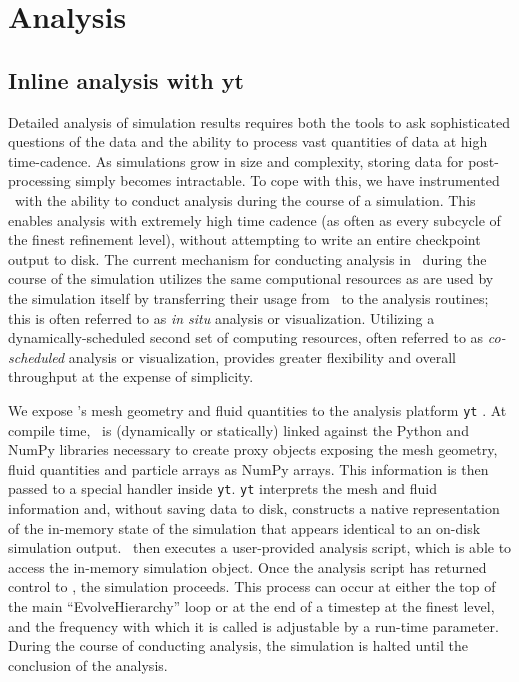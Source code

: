 
\section{Analysis}
\label{sec.num.analysis}

\subsection{Inline analysis with yt}

Detailed analysis of simulation results requires both the tools to ask
sophisticated questions of the data and the ability to process vast quantities of
data at high time-cadence.  As simulations grow in size and complexity, storing data
for post-processing simply becomes intractable.  To cope with this, we have
instrumented \enzo\ with the ability to conduct analysis during the course of a
simulation.  This enables analysis with extremely high time cadence (as often
as every subcycle of the finest refinement level), without
attempting to write an entire checkpoint output to disk.  The current mechanism
for conducting analysis in \enzo\ during the course of the simulation utilizes
the same computional resources as are used by the simulation itself by transferring their usage 
from \enzo\ to the analysis routines; this is often
referred to as \textit{in situ} analysis or visualization.  Utilizing a
dynamically-scheduled second set of computing resources, often referred to as
\textit{co-scheduled} analysis or visualization, provides greater flexibility and overall
throughput at the expense of simplicity.

We expose \enzo's mesh geometry and fluid quantities to the analysis platform
\texttt{yt} \citep{2011ApJS..192....9T, 2011arXiv1112.4482T}.  At compile time,
\enzo\ is (dynamically or statically) linked against the Python and NumPy
libraries necessary to create proxy objects exposing the mesh geometry,
fluid quantities and particle arrays as NumPy arrays.  This information is then
passed to a special handler inside \texttt{yt}.  \texttt{yt} interprets the
mesh and fluid information and, without saving data to disk, constructs a native representation of the in-memory state
of the simulation that appears identical to an on-disk simulation output.
\enzo\ then executes a user-provided analysis script, which is able to access the
in-memory simulation object.  Once the analysis script has returned control to
\enzo, the simulation proceeds.  This process can occur at either the top of the
main ``EvolveHierarchy'' loop or at the end of a timestep at the finest level,
and the frequency with which it is called is adjustable by a run-time
parameter.  During the course of conducting analysis, the simulation is halted
until the conclusion of the analysis.

